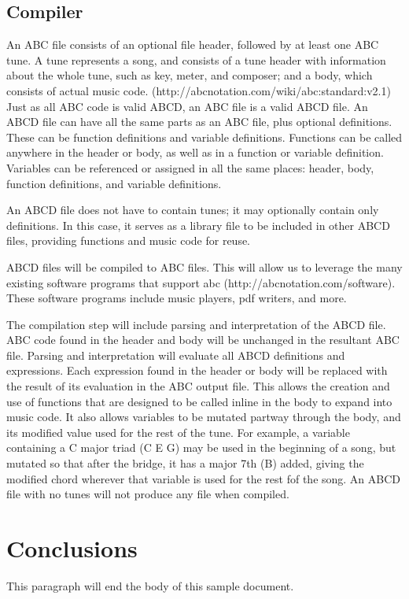 \subsection{Compiler}
An ABC file consists of an optional file header, followed by at least one ABC tune. A tune represents a song, and consists of a tune header with information about the whole tune, such as key, meter, and composer; and a body, which consists of actual music code. (http://abcnotation.com/wiki/abc:standard:v2.1) Just as all ABC code is valid ABCD, an ABC file is a valid ABCD file. An ABCD file can have all the same parts as an ABC file, plus optional definitions. These can be function definitions and variable definitions. Functions can be called anywhere in the header or body, as well as in a function or variable definition. Variables can be referenced or assigned in all the same places: header, body, function definitions, and variable definitions.
	
An ABCD file does not have to contain tunes; it may optionally contain only definitions. In this case, it serves as a library file to be included in other ABCD files, providing functions and music code for reuse.
	
ABCD files will be compiled to ABC files. This will allow us to leverage the many existing software programs that support abc (http://abcnotation.com/software). These software programs include music players, pdf writers, and more.

The compilation step will include parsing and interpretation of the ABCD file. ABC code found in the header and body will be unchanged in the resultant ABC file. Parsing and interpretation will evaluate all ABCD definitions and expressions. Each expression found in the header or body will be replaced with the result of its evaluation in the ABC output file. This allows the creation and use of functions that are designed to be called inline in the body to expand into music code. It also allows variables to be mutated partway through the body, and its modified value used for the rest of the tune. For example, a variable containing a C major triad (C E G) may be used in the beginning of a song, but mutated so that after the bridge, it has a major 7th (B) added, giving the modified chord wherever that variable is used for the rest fof the song. An ABCD file with no tunes will not produce any file when compiled.


\section{Conclusions}

This paragraph will end the body of this sample document.
